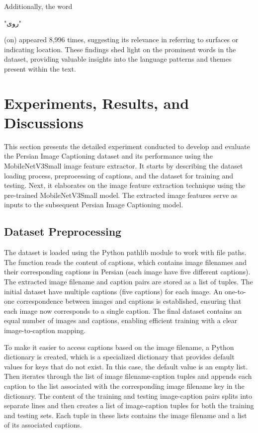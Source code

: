 \documentclass[runningheads]{llncs}
\begin{document}
Additionally, the word \begin{farsi} \arabicfont\small "روی"\end{farsi} (on) appeared 8,996 times, suggesting its relevance in referring to surfaces or indicating location. These findings shed light on the prominent words in the dataset, providing valuable insights into the language patterns and themes present within the text.

\section{Experiments, Results, and Discussions}

This section presents the detailed experiment conducted to develop and evaluate the Persian Image Captioning dataset and its performance using the MobileNetV3Small image feature extractor. It starts by describing the dataset loading process, preprocessing of captions, and the dataset for training and testing. Next, it elaborates on the image feature extraction technique using the pre-trained MobileNetV3Small model. The extracted image features serve as inputs to the subsequent Persian Image Captioning model.

\subsection{Dataset Preprocessing}
The dataset is loaded using the Python pathlib module to work with file paths. The function reads the content of captions, which contains image filenames and their corresponding captions in Persian (each image have five different captions). The extracted image filename and caption pairs are stored as a list of tuples. The initial dataset have multiple captions (five captions) for each image. An one-to-one correspondence between images and captions is established, ensuring that each image now corresponds to a single caption. The final dataset contains an equal number of images and captions, enabling efficient training with a clear image-to-caption mapping.

To make it easier to access captions based on the image filename, a Python dictionary is created, which is a specialized dictionary that provides default values for keys that do not exist. In this case, the default value is an empty list. Then iterates through the list of image filename-caption tuples and appends each caption to the list associated with the corresponding image filename key in the dictionary. The content of the training and testing image-caption pairs splits into separate lines and then creates a list of image-caption tuples for both the training and testing sets. Each tuple in these lists contains the image filename and a list of its associated captions.
\end{document}
